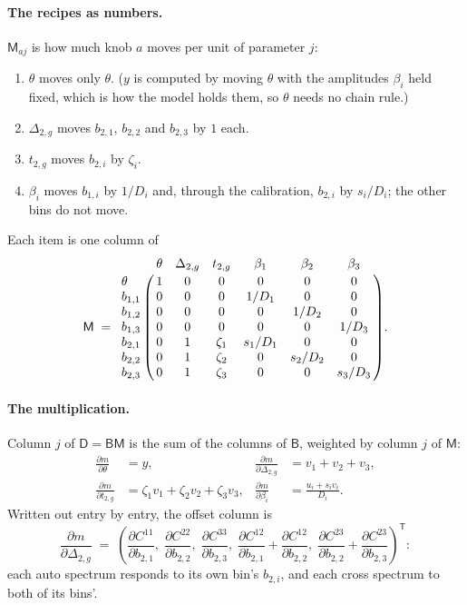 \documentclass[11pt]{article}
\newcommand{\T}{^{\mathsf{T}}}
\newcommand{\mB}{\mathsf{B}}
\newcommand{\mM}{\mathsf{M}}
\newcommand{\mD}{\mathsf{D}}
\begin{document}
\paragraph{The recipes as numbers.}
$\mM_{aj}$ is how much knob $a$ moves per unit of parameter $j$:
\begin{enumerate}
  \item $\theta$ moves only $\theta$.  ($y$ is computed by moving
    $\theta$ with the amplitudes $\beta_i$ held fixed, which is how the
    model holds them, so $\theta$ needs no chain rule.)
  \item $\Delta_{2,g}$ moves $b_{2,1}$, $b_{2,2}$ and $b_{2,3}$ by $1$
    each.
  \item $t_{2,g}$ moves $b_{2,i}$ by $\zeta_i$.
  \item $\beta_i$ moves $b_{1,i}$ by $1/D_i$ and, through the
    calibration, $b_{2,i}$ by $s_i/D_i$; the other bins do not move.
\end{enumerate}
Each item is one column of
\begin{equation}
  \mM \;=\; \bordermatrix{
            & \theta & \Delta_{2,g} & t_{2,g} & \beta_1 & \beta_2 & \beta_3 \cr
    \theta  & 1 & 0 & 0       & 0       & 0       & 0       \cr
    b_{1,1} & 0 & 0 & 0       & 1/D_1   & 0       & 0       \cr
    b_{1,2} & 0 & 0 & 0       & 0       & 1/D_2   & 0       \cr
    b_{1,3} & 0 & 0 & 0       & 0       & 0       & 1/D_3   \cr
    b_{2,1} & 0 & 1 & \zeta_1 & s_1/D_1 & 0       & 0       \cr
    b_{2,2} & 0 & 1 & \zeta_2 & 0       & s_2/D_2 & 0       \cr
    b_{2,3} & 0 & 1 & \zeta_3 & 0       & 0       & s_3/D_3 \cr} .
  \label{eq:toyM}
\end{equation}

\paragraph{The multiplication.}
Column $j$ of $\mD = \mB\mM$ is the sum of the columns of $\mB$, weighted
by column $j$ of $\mM$:
\begin{align}
  \frac{\partial m}{\partial \theta} &= y ,
  &
  \frac{\partial m}{\partial \Delta_{2,g}} &= v_1 + v_2 + v_3 ,
  \nonumber \\
  \frac{\partial m}{\partial t_{2,g}}
    &= \zeta_1 v_1 + \zeta_2 v_2 + \zeta_3 v_3 ,
  &
  \frac{\partial m}{\partial \beta_i}
    &= \frac{u_i + s_i v_i}{D_i} .
  \label{eq:toyD}
\end{align}
Written out entry by entry, the offset column is
\begin{equation}
  \frac{\partial m}{\partial \Delta_{2,g}} \;=\;
  \left(
    \frac{\partial C^{11}}{\partial b_{2,1}},\;
    \frac{\partial C^{22}}{\partial b_{2,2}},\;
    \frac{\partial C^{33}}{\partial b_{2,3}},\;
    \frac{\partial C^{12}}{\partial b_{2,1}}
      + \frac{\partial C^{12}}{\partial b_{2,2}},\;
    \frac{\partial C^{23}}{\partial b_{2,2}}
      + \frac{\partial C^{23}}{\partial b_{2,3}}
  \right)\T :
\end{equation}
each auto spectrum responds to its own bin's $b_{2,i}$, and each cross
spectrum to both of its bins'.
\end{document}
